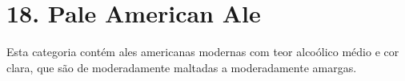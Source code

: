\section*{18. Pale American Ale}

Esta categoria contém ales americanas modernas com teor alcoólico médio e cor clara, que são de moderadamente maltadas a moderadamente amargas.
